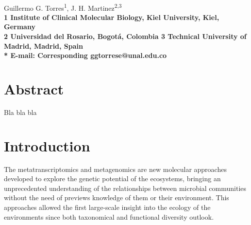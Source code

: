 \documentclass[10pt,letterpaper]{article}
\date{}
\begin{document}
\vspace*{0.35in}

\begin{flushleft}
{\Large
\textbf{}
}
\newline
\\
Guillermo G. Torres\textsuperscript{1},
J. H. Martinez\textsuperscript{2,3}
\\
\bf{1} Institute of Clinical Molecular Biology, Kiel University, Kiel, Germany
\\
\bf{2} Universidad del Rosario, Bogotá, Colombia
\bf{3} Technical University of Madrid, Madrid, Spain
\\

% 
%


* E-mail: Corresponding ggtorrese@unal.edu.co
\end{flushleft}

\section*{Abstract}
Bla bla bla

\linenumbers

\section*{Introduction}
The metatranscriptomics and metagenomics are new molecular approaches developed to explore the genetic potential of the ecosystems, bringing an unprecedented understanding of the relationships between microbial communities without the need of previews knowledge of them or their environment. This approaches allowed the first large-scale insight into the ecology of the environments since both taxonomical and functional diversity outlook.
	
\end{document}
